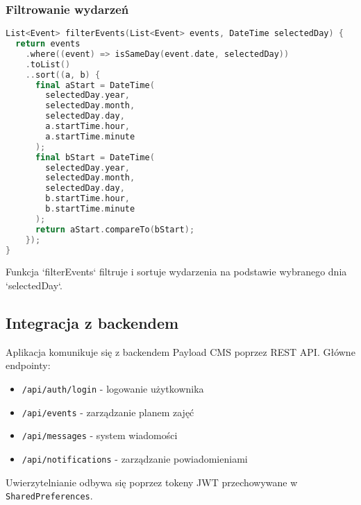 \subsubsection{Filtrowanie wydarzeń}
\begin{lstlisting}[language=C++, caption=Filtrowanie wydarzeń, label={lst:event-filtering}]
List<Event> filterEvents(List<Event> events, DateTime selectedDay) {
  return events
    .where((event) => isSameDay(event.date, selectedDay))
    .toList()
    ..sort((a, b) {
      final aStart = DateTime(
        selectedDay.year, 
        selectedDay.month, 
        selectedDay.day,
        a.startTime.hour,
        a.startTime.minute
      );
      final bStart = DateTime(
        selectedDay.year,
        selectedDay.month,
        selectedDay.day,
        b.startTime.hour,
        b.startTime.minute
      );
      return aStart.compareTo(bStart);
    });
}
\end{lstlisting}
Funkcja `filterEvents` filtruje i sortuje wydarzenia na podstawie wybranego dnia `selectedDay`.

\subsection{Integracja z backendem}

Aplikacja komunikuje się z backendem Payload CMS poprzez REST API. Główne endpointy:

\begin{itemize}
  \item \texttt{/api/auth/login} - logowanie użytkownika
  \item \texttt{/api/events} - zarządzanie planem zajęć
  \item \texttt{/api/messages} - system wiadomości
  \item \texttt{/api/notifications} - zarządzanie powiadomieniami
\end{itemize}
Uwierzytelnianie odbywa się poprzez tokeny JWT przechowywane w \texttt{SharedPreferences}.
